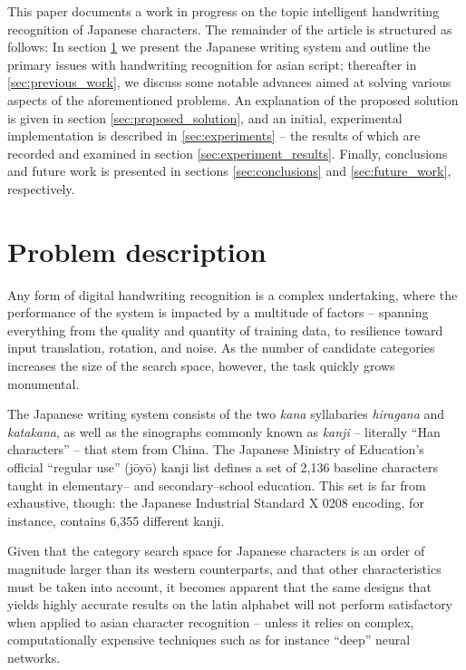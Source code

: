 \documentclass[10pt,conference,a4paper]{IEEEtran}
\begin{document}
	This paper documents a work in progress on the topic intelligent handwriting recognition of Japanese characters.
	The remainder of the article is structured as follows:
	In section \ref{sec:problem_description} we present the Japanese writing system and outline the primary issues with handwriting recognition for asian script;
	thereafter in \ref{sec:previous_work}, we discuss some notable advances aimed at solving various aspects of the aforementioned problems.
	An explanation of the proposed solution is given in section \ref{sec:proposed_solution}, and an initial, experimental implementation is described in \ref{sec:experiments}
	-- the results of which are recorded and examined in section \ref{sec:experiment_results}. Finally, conclusions and future work is presented in sections
	\ref{sec:conclusions} and \ref{sec:future_work}, respectively.
	


	\section{Problem description}
	\label{sec:problem_description}

	Any form of digital handwriting recognition is a complex undertaking,
	where the performance of the system is impacted by a multitude of factors -- spanning
	everything from the quality and quantity of training data, to resilience toward input
	translation, rotation, and noise. As the number of candidate categories increases
	the size of the search space, however, the task quickly grows monumental.

	The Japanese writing system consists of the two \emph{kana} syllabaries \emph{hiragana} and \emph{katakana},
	as well as the sinographs commonly known as \emph{kanji} -- literally ``Han characters'' -- that stem from China.
	The Japanese Ministry of Education's official ``regular use'' (j\=oy\=o) kanji list defines a set of 2,136
	baseline characters taught in elementary-- and secondary--school education. \cite{hadamitzky2012japanese}
	This set is far from exhaustive, though: the Japanese Industrial Standard X 0208 encoding, for instance, contains 6,355 different kanji.

	Given that the category search space for Japanese characters is an order of magnitude larger than its western counterparts,
	and that other characteristics must be taken into account, it becomes apparent that the same designs that
	yields highly accurate results on the latin alphabet will not perform satisfactory when applied to asian character recognition \cite{tappert1990state, liu2004online}
	-- unless it relies on complex, computationally expensive techniques such as for instance ``deep'' neural networks. \cite{ciresan2012multi}
\end{document}
